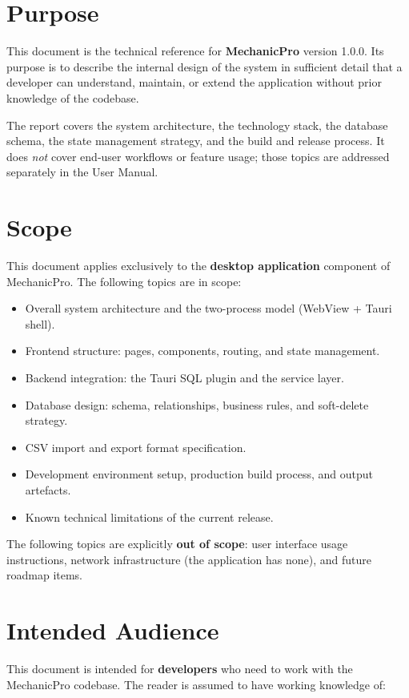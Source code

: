 \documentclass[12pt, a4paper]{report}
\begin{document}
	\section{Purpose}
	This document is the technical reference for \textbf{MechanicPro} version 1.0.0.
	Its purpose is to describe the internal design of the system in sufficient detail
	that a developer can understand, maintain, or extend the application without
	prior knowledge of the codebase.
	
	The report covers the system architecture, the technology stack, the database
	schema, the state management strategy, and the build and release process.
	It does \emph{not} cover end-user workflows or feature usage; those topics
	are addressed separately in the User Manual.
	
	\section{Scope}
	This document applies exclusively to the \textbf{desktop application} component
	of MechanicPro. The following topics are in scope:
	
	\begin{itemize}
		\item Overall system architecture and the two-process model (WebView + Tauri shell).
		\item Frontend structure: pages, components, routing, and state management.
		\item Backend integration: the Tauri SQL plugin and the service layer.
		\item Database design: schema, relationships, business rules, and soft-delete strategy.
		\item CSV import and export format specification.
		\item Development environment setup, production build process, and output artefacts.
		\item Known technical limitations of the current release.
	\end{itemize}
	
	The following topics are explicitly \textbf{out of scope}: user interface usage
	instructions, network infrastructure (the application has none), and future
	roadmap items.
	
	\section{Intended Audience}
	This document is intended for \textbf{developers} who need to work with the
	MechanicPro codebase. The reader is assumed to have working knowledge of:
	
\end{document}
